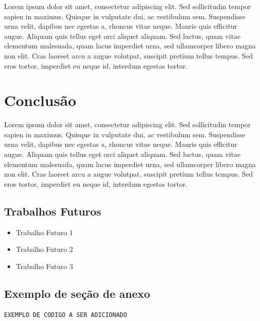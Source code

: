 \documentclass[
	12pt,				%
	openright,			%
	oneside,			%
	a4paper,			%
	english,			%
	brazil				%
	]{abntex2}
\begin{document}
 Lorem ipsum dolor sit amet, consectetur adipiscing elit. Sed sollicitudin tempor sapien in maximus. Quisque in vulputate dui, ac vestibulum sem. Suspendisse urna velit, dapibus nec egestas a, rhoncus vitae neque. Mauris quis efficitur augue. Aliquam quis tellus eget orci aliquet aliquam. Sed luctus, quam vitae elementum malesuada, quam lacus imperdiet urna, sed ullamcorper libero magna non elit. Cras laoreet arcu a augue volutpat, suscipit pretium tellus tempus. Sed eros tortor, imperdiet eu neque id, interdum egestas tortor.

 \chapter{Conclusão}

 Lorem ipsum dolor sit amet, consectetur adipiscing elit. Sed sollicitudin tempor sapien in maximus. Quisque in vulputate dui, ac vestibulum sem. Suspendisse urna velit, dapibus nec egestas a, rhoncus vitae neque. Mauris quis efficitur augue. Aliquam quis tellus eget orci aliquet aliquam. Sed luctus, quam vitae elementum malesuada, quam lacus imperdiet urna, sed ullamcorper libero magna non elit. Cras laoreet arcu a augue volutpat, suscipit pretium tellus tempus. Sed eros tortor, imperdiet eu neque id, interdum egestas tortor.

 \section{Trabalhos Futuros}

\begin{itemize}
    \item Trabalho Futuro 1
    \item Trabalho Futuro 2
    \item Trabalho Futuro 3
\end{itemize}

\postextual



\begin{apendicesenv}

\partapendices

\chapter{\label{AnexoA}Exemplo de seção de anexo}

\begin{lstlisting}
EXEMPLO DE CODIGO A SER ADICIONADO
\end{lstlisting}

\end{apendicesenv}
\end{document}
